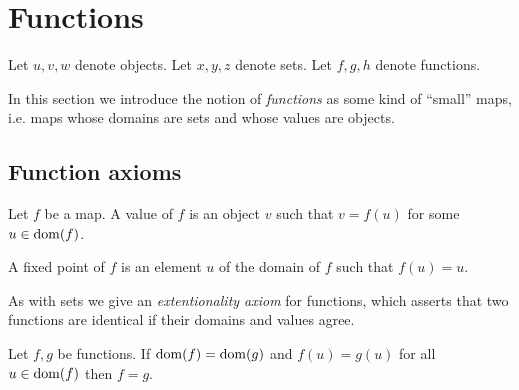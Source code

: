 \documentclass[../../set-theory.tex]{subfiles}
\begin{document}
  \section{Functions}

  \begin{forthel}
  \end{forthel}

  \begin{forthel}
    Let $u,v,w$ denote objects.
    Let $x,y,z$ denote sets.
    Let $f,g,h$ denote functions.
  \end{forthel}

  \noindent In this section we introduce the notion of \textit{functions} as
  some kind of \enquote{small} maps, i.e. maps whose domains are sets and whose
  values are objects.


  \subsection{Function axioms}

  \begin{forthel}
    \begin{definition}
      Let $f$ be a map.
      A value of $f$ is an object $v$ such that $v = f(u)$ for some $u \in \operatorname{dom}(f)$.
    \end{definition}

    \begin{definition}
      A fixed point of $f$ is an element $u$ of the domain of $f$ such that $f(u) = u$.
    \end{definition}
  \end{forthel}

  \noindent As with sets we give an \textit{extentionality axiom} for functions, which
  asserts that two functions are identical if their domains and values agree.

  \begin{forthel}
    \begin{axiom}\label{SetTheory_02_01_200419}
      Let $f,g$ be functions.
      If $\operatorname{dom}(f) = \operatorname{dom}(g)$ and $f(u) = g(u)$ for all $u \in \operatorname{dom}(f)$ then $f = g$.
    \end{axiom}
  \end{forthel}

\end{document}
